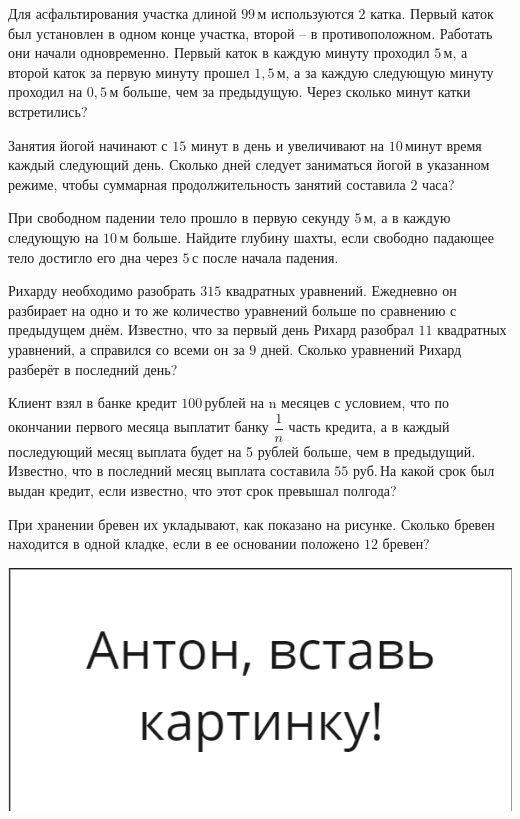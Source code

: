 \begin{class}[number=3]
\begin{listofex}
			\item Для асфальтирования участка длиной \( 99 \) м используются \( 2  \) катка. Первый каток был установлен в одном конце участка, второй -- в противоположном. Работать они начали одновременно. Первый каток в каждую минуту проходил \( 5 \) м, а второй каток за первую минуту прошел \( 1,5 \) м, а за каждую следующую минуту проходил на \( 0,5 \) м больше, чем за предыдущую. Через сколько минут катки встретились?
			
			\item Занятия йогой начинают с \( 15 \) минут в день и увеличивают на \( 10 \) минут время каждый следующий день. Сколько дней следует заниматься йогой в указанном режиме, чтобы суммарная продолжительность занятий составила \( 2 \) часа?
			
			\item При свободном падении тело прошло в первую секунду \( 5 \) м, а в каждую следующую на \( 10 \) м больше. Найдите глубину шахты, если свободно падающее тело достигло его дна через \( 5 \) с после начала падения.
			
			\item Рихарду необходимо разобрать \( 315 \) квадратных уравнений. Ежедневно он разбирает на одно и то же количество уравнений больше по сравнению с предыдущем днём. Известно, что за первый день Рихард разобрал \( 11 \) квадратных уравнений, а справился со всеми он за \( 9 \) дней. Сколько уравнений Рихард разберёт в последний день?
			
			\item Клиент взял в банке кредит \( 100 \) рублей на n месяцев с условием, что по окончании первого месяца выплатит банку \( \dfrac{1}{n} \) часть кредита, а в каждый последующий месяц выплата будет на 5 рублей больше, чем в предыдущий. Известно, что в последний месяц выплата составила \( 55 \) руб. На какой срок был выдан кредит, если известно, что этот срок превышал полгода?
			
			\item 
			\begin{minipage}[t]{0.57\textwidth}
				При хранении бревен их укладывают, как показано на рисунке. Сколько бревен находится в одной кладке, если в ее основании положено \( 12 \) бревен?
			\end{minipage}
			\begin{minipage}[c]{0.3\textwidth}
				\includegraphics[align=t, width=\textwidth]{pics/G91M4L4-1}
			\end{minipage}
		

\end{listofex}
\end{class}
